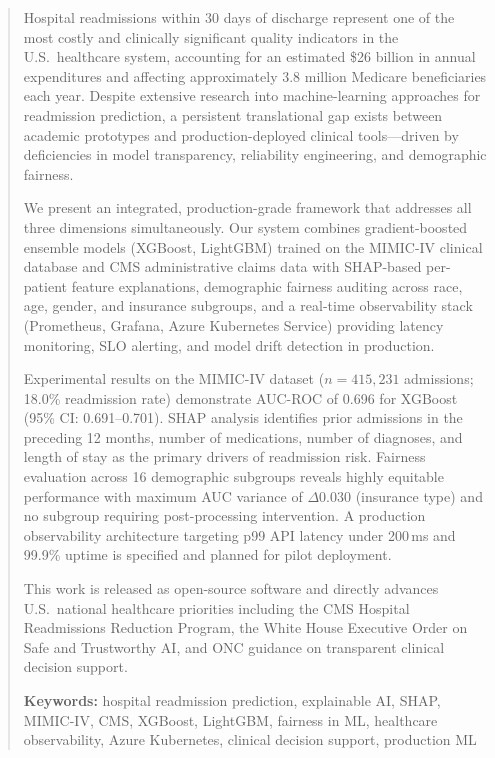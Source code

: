 \documentclass[11pt,letterpaper]{article}
\begin{document}
\begin{abstract}
Hospital readmissions within 30 days of discharge represent one of the most costly and clinically significant quality indicators in the U.S.\ healthcare system, accounting for an estimated \$26 billion in annual expenditures and affecting approximately 3.8 million Medicare beneficiaries each year. Despite extensive research into machine-learning approaches for readmission prediction, a persistent translational gap exists between academic prototypes and production-deployed clinical tools---driven by deficiencies in model transparency, reliability engineering, and demographic fairness.

We present an integrated, production-grade framework that addresses all three dimensions simultaneously. Our system combines gradient-boosted ensemble models (XGBoost, LightGBM) trained on the MIMIC-IV clinical database and CMS administrative claims data with SHAP-based per-patient feature explanations, demographic fairness auditing across race, age, gender, and insurance subgroups, and a real-time observability stack (Prometheus, Grafana, Azure Kubernetes Service) providing latency monitoring, SLO alerting, and model drift detection in production.

Experimental results on the MIMIC-IV dataset ($n = 415{,}231$ admissions; 18.0\% readmission rate) demonstrate AUC-ROC of 0.696 for XGBoost (95\% CI: 0.691--0.701). SHAP analysis identifies prior admissions in the preceding 12 months, number of medications, number of diagnoses, and length of stay as the primary drivers of readmission risk. Fairness evaluation across 16 demographic subgroups reveals highly equitable performance with maximum AUC variance of $\Delta$0.030 (insurance type) and no subgroup requiring post-processing intervention. A production observability architecture targeting p99 API latency under 200\,ms and 99.9\% uptime is specified and planned for pilot deployment.

This work is released as open-source software and directly advances U.S.\ national healthcare priorities including the CMS Hospital Readmissions Reduction Program, the White House Executive Order on Safe and Trustworthy AI, and ONC guidance on transparent clinical decision support.

\medskip
\noindent\textbf{Keywords:} hospital readmission prediction, explainable AI, SHAP, MIMIC-IV, CMS, XGBoost, LightGBM, fairness in ML, healthcare observability, Azure Kubernetes, clinical decision support, production ML
\end{abstract}
\end{document}
